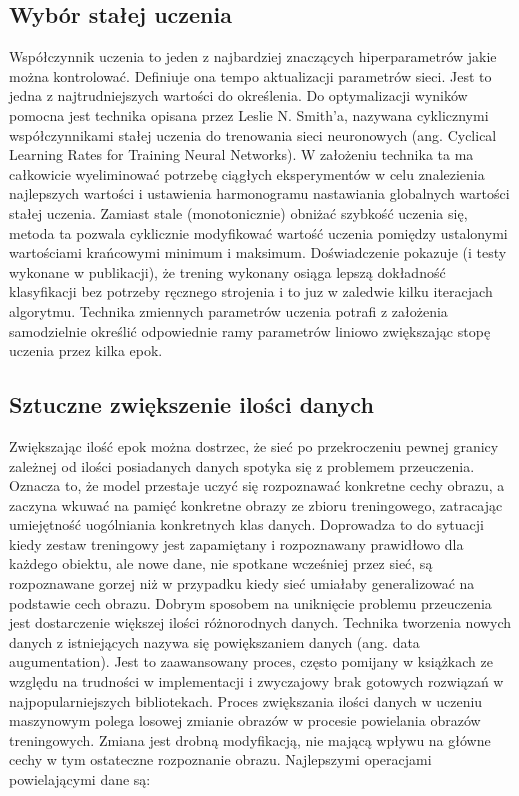 \documentclass[12pt,a4paper,twoside,titlepage,openright]{book}
\begin{document}
\subsection{Wybór stałej uczenia}
Współczynnik uczenia to jeden z najbardziej znaczących hiperparametrów jakie można kontrolować. Definiuje ona tempo aktualizacji parametrów sieci. Jest to jedna z najtrudniejszych wartości do określenia. Do optymalizacji wyników pomocna jest technika opisana przez Leslie N. Smith’a, nazywana cyklicznymi współczynnikami stałej uczenia do trenowania sieci neuronowych (ang. Cyclical Learning Rates for Training Neural Networks). W założeniu technika ta ma całkowicie wyeliminować potrzebę ciągłych eksperymentów w celu znalezienia najlepszych wartości i ustawienia harmonogramu nastawiania globalnych wartości stałej uczenia. Zamiast stale (monotonicznie) obniżać szybkość uczenia się, metoda ta pozwala cyklicznie modyfikować wartość uczenia pomiędzy ustalonymi wartościami krańcowymi minimum i maksimum. Doświadczenie pokazuje (i testy wykonane w publikacji), że trening wykonany osiąga lepszą dokładność klasyfikacji bez potrzeby ręcznego strojenia i to juz w zaledwie kilku iteracjach algorytmu. Technika zmiennych parametrów uczenia potrafi z założenia samodzielnie określić odpowiednie ramy parametrów liniowo zwiększając stopę uczenia przez kilka epok. \cite{DBLP:journals/corr/Smith15a}

\subsection{Sztuczne zwiększenie ilości danych}
Zwiększając ilość epok można dostrzec, że sieć po przekroczeniu pewnej granicy zależnej od ilości posiadanych danych spotyka się z problemem przeuczenia. Oznacza to, że model przestaje uczyć się rozpoznawać konkretne cechy obrazu, a zaczyna wkuwać na pamięć konkretne obrazy ze zbioru treningowego, zatracając umiejętność uogólniania konkretnych klas danych. Doprowadza to do sytuacji kiedy zestaw treningowy jest zapamiętany i rozpoznawany prawidłowo dla każdego obiektu, ale nowe dane, nie spotkane wcześniej przez sieć, są rozpoznawane gorzej niż w przypadku kiedy sieć umiałaby generalizować na podstawie cech obrazu.
Dobrym sposobem na uniknięcie problemu przeuczenia jest dostarczenie większej ilości różnorodnych danych. Technika tworzenia nowych danych z istniejących nazywa się powiększaniem danych (ang. data augumentation). Jest to zaawansowany proces, często pomijany w książkach ze względu na trudności w implementacji i zwyczajowy brak gotowych rozwiązań w najpopularniejszych bibliotekach. 
Proces zwiększania ilości danych w uczeniu maszynowym polega losowej zmianie obrazów w procesie powielania obrazów treningowych. Zmiana jest drobną modyfikacją, nie mającą wpływu na główne cechy w tym ostateczne rozpoznanie obrazu. Najlepszymi operacjami powielającymi dane są:
\end{document}
